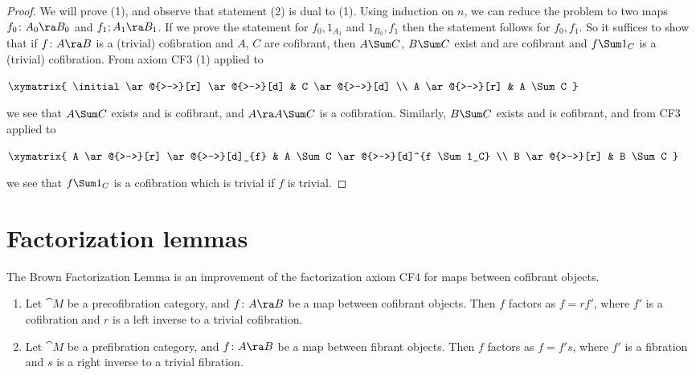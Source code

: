 \begin{proof}
We will prove (1), and observe that statement (2) is dual to (1). Using induction on $n$, we can reduce the problem to two maps $f_0 \colon A_0 \ra B_0$ and $f_1 ; A_1 \ra B_1$. If we prove the statement for $f_0, 1_{A_1}$ and $1_{B_0}, f_1$ then the statement follows for $f_0, f_1$. So it suffices to show that if $f \colon A \ra B$ is a (trivial) cofibration and $A$, $C$ are cofibrant, then $A \Sum C$, $B \Sum C$ exist and are cofibrant and $f \Sum 1_C$ is a (trivial) cofibration. From axiom CF3 (1) applied to 
\begin{center}
$ \xymatrix {
	\initial \ar@{>->}[r] \ar@{>->}[d] &
	C \ar@{>->}[d] \\
	A \ar@{>->}[r] &
	A \Sum C
	}$
\end{center}
we see that $A \Sum C$ exists and is cofibrant, and $A \ra A \Sum C$ is a cofibration. Similarly, $B \Sum C$ exists and is cofibrant, and from CF3 applied to
\begin{center}
$ \xymatrix {
	A \ar@{>->}[r] \ar@{>->}[d]_{f} &
	A \Sum C \ar@{>->}[d]^{f \Sum 1_C} \\
	B \ar@{>->}[r] & 
	B \Sum C
	}$
\end{center}
we see that $f \Sum 1_C$ is a cofibration which is trivial if $f$ is trivial.
\end{proof}

\section{Factorization lemmas}
\label{sec:factlemmas}
The Brown Factorization Lemma is an improvement of the factorization axiom CF4 for maps between cofibrant objects.

\begin{lem}
\label{lem:brownfact}
\mbox{}
\begin{enumerate}
\item
Let ${\cat M}$ be a precofibration category, and $f \colon A \ra B$ be a map between cofibrant objects. Then $f$ factors as $f = rf'$, where $f'$ is a cofibration and $r$ is a left inverse to a trivial cofibration. 
\item
Let ${\cat M}$ be a prefibration category, and $f \colon A \ra B$ be a map between fibrant objects. Then $f$ factors as $f = f's$, where $f'$ is a fibration and $s$ is a right inverse to a trivial fibration.
\end{enumerate}
\end{lem}

